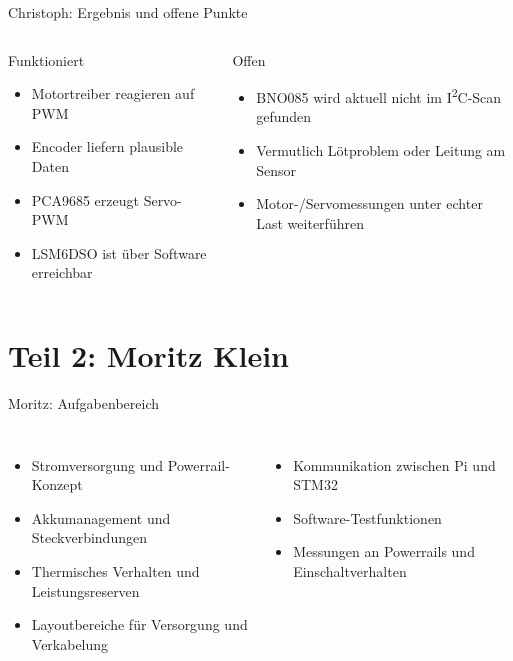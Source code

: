\documentclass[aspectratio=169,11pt]{beamer}
\newcommand{\smallitem}{\setlength{\itemsep}{0.45em}}
\begin{document}
\begin{frame}{Christoph: Ergebnis und offene Punkte}
  \begin{columns}[T,onlytextwidth]
      \begin{block}{Funktioniert}
        \begin{itemize}
          \item Motortreiber reagieren auf PWM
          \item Encoder liefern plausible Daten
          \item PCA9685 erzeugt Servo-PWM
          \item LSM6DSO ist \"uber Software erreichbar
        \end{itemize}
      \end{block}
      \begin{block}{Offen}
        \begin{itemize}
          \item BNO085 wird aktuell nicht im I\textsuperscript{2}C-Scan gefunden
          \item Vermutlich L\"otproblem oder Leitung am Sensor
          \item Motor-/Servomessungen unter echter Last weiterf\"uhren
        \end{itemize}
      \end{block}
  \end{columns}
\end{frame}

\section{Teil 2: Moritz Klein}

\begin{frame}{Moritz: Aufgabenbereich}
  \begin{columns}[T,onlytextwidth]
      \begin{itemize}
        \smallitem
        \item Stromversorgung und Powerrail-Konzept
        \item Akkumanagement und Steckverbindungen
        \item Thermisches Verhalten und Leistungsreserven
        \item Layoutbereiche f\"ur Versorgung und Verkabelung
      \end{itemize}
      \begin{itemize}
        \smallitem
        \item Kommunikation zwischen Pi und STM32
        \item Software-Testfunktionen
        \item Messungen an Powerrails und Einschaltverhalten
      \end{itemize}
  \end{columns}
\end{frame}
\end{document}
